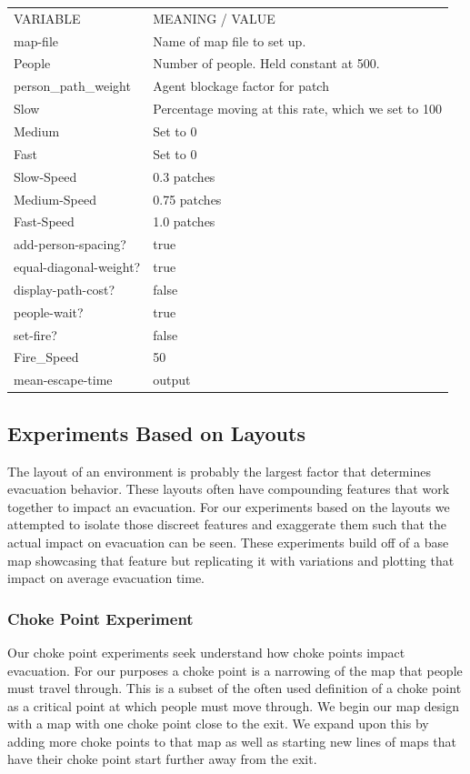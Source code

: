 \documentclass[12pt,letterpaper]{article}
\begin{document}
\begin{tabular}{ l | l }
VARIABLE & MEANING / VALUE \\
map-file & Name of map file to set up. \\
People & Number  of people. Held constant at 500. \\
person\_path\_weight & Agent blockage factor for patch \\
Slow & Percentage moving at this rate, which we set to 100 \\
Medium & Set to 0 \\
Fast & Set to 0 \\
Slow-Speed & 0.3 patches \\
Medium-Speed & 0.75 patches \\
Fast-Speed & 1.0 patches \\
add-person-spacing? & true \\
equal-diagonal-weight? & true \\
display-path-cost? & false \\
people-wait? & true \\
set-fire? & false \\
Fire\_Speed & 50 \\
mean-escape-time & output \\
\end{tabular}

\subsection{Experiments Based on Layouts} \label{expLayout}

The layout of an environment is probably the largest factor that determines evacuation behavior.  These layouts often have compounding features that work together to impact an evacuation\cite{abmEvac}. For our experiments based on the layouts we attempted to isolate those discreet features and exaggerate them such that the actual impact on evacuation can be seen.  These experiments build off of a base map showcasing that feature but replicating it with variations and plotting that impact on average evacuation time.


\subsubsection{Choke Point Experiment}

Our choke point experiments seek understand how choke points impact evacuation.  For our purposes a choke point is a narrowing of the map that people must travel through.  This is a subset of the often used definition of a choke point as a critical point at which people must move through\cite{evacOptions}.  We begin our map design with a map with one choke point close to the exit.  We expand upon this by adding more choke points to that map as well as starting new lines of maps that have their choke point start further away from the exit.
\end{document}
